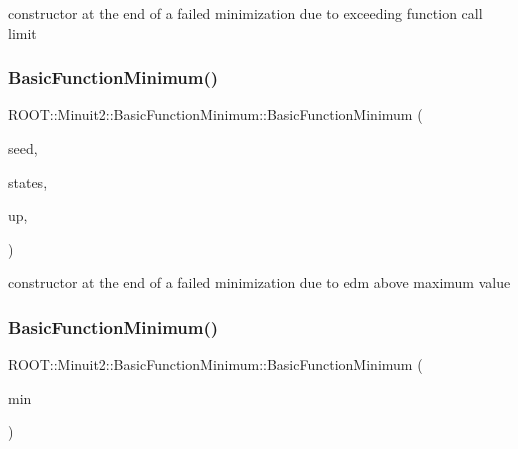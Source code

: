 constructor at the end of a failed minimization due to exceeding function call limit 

\mbox{\label{classROOT_1_1Minuit2_1_1BasicFunctionMinimum_ae30a460175a2bbf715f3ee0d6092c8b6}} 
\subsubsection{\texorpdfstring{BasicFunctionMinimum()}{BasicFunctionMinimum()}\hspace{0.1cm}{\footnotesize\ttfamily [9/15]}}
{\footnotesize\ttfamily R\+O\+O\+T\+::\+Minuit2\+::\+Basic\+Function\+Minimum\+::\+Basic\+Function\+Minimum (\begin{DoxyParamCaption}\item[{const \mbox{\hyperlink{classROOT_1_1Minuit2_1_1MinimumSeed}{Minimum\+Seed}} \&}]{seed,  }\item[{const std\+::vector$<$ \mbox{\hyperlink{classROOT_1_1Minuit2_1_1MinimumState}{Minimum\+State}} $>$ \&}]{states,  }\item[{double}]{up,  }\item[{\mbox{\hyperlink{classROOT_1_1Minuit2_1_1BasicFunctionMinimum_1_1MnAboveMaxEdm}{Mn\+Above\+Max\+Edm}}}]{ }\end{DoxyParamCaption})\hspace{0.3cm}{\ttfamily [inline]}}



constructor at the end of a failed minimization due to edm above maximum value 

\mbox{\label{classROOT_1_1Minuit2_1_1BasicFunctionMinimum_ae0812dcb933989ffd9e096792367d0b7}} 
\subsubsection{\texorpdfstring{BasicFunctionMinimum()}{BasicFunctionMinimum()}\hspace{0.1cm}{\footnotesize\ttfamily [10/15]}}
{\footnotesize\ttfamily R\+O\+O\+T\+::\+Minuit2\+::\+Basic\+Function\+Minimum\+::\+Basic\+Function\+Minimum (\begin{DoxyParamCaption}\item[{const \mbox{\hyperlink{classROOT_1_1Minuit2_1_1BasicFunctionMinimum}{Basic\+Function\+Minimum}} \&}]{min }\end{DoxyParamCaption})\hspace{0.3cm}{\ttfamily [inline]}}



